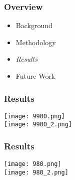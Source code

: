\begin{frame}
\frametitle{Overview}
    \begin{itemize}
        \item Background
        \item Methodology 
        \item \emph{\color{UOYellow}Results}
        \item Future Work
    \end{itemize}
\end{frame}

\begin{frame}
\frametitle{Results}
    \center\texttt{[image: 9900.png]}\\
    \center\texttt{[image: 9900\_2.png]}\\
\end{frame}

\begin{frame}
    \frametitle{Results}
    \center\texttt{[image: 980.png]}\\
    \center\texttt{[image: 980\_2.png]}
\end{frame}
